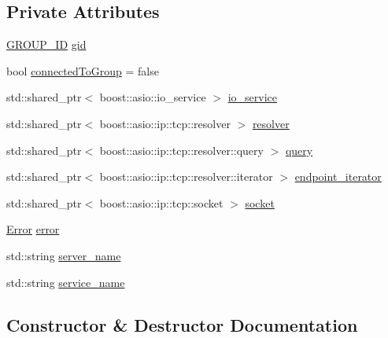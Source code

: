 \subsection*{Private Attributes}
\begin{DoxyCompactItemize}
\item 
\hyperlink{namespaceshaan97_1_1sync_a34cebf175d27dfc3d82f24608f7043c1}{G\+R\+O\+U\+P\+\_\+\+ID} \hyperlink{classshaan97_1_1sync_1_1_client_a2708c76151616ac36af4aedecee5beb1}{gid}
\item 
bool \hyperlink{classshaan97_1_1sync_1_1_client_a8dc007c6e1c0fb4a20112e8cc10b8b7c}{connected\+To\+Group} = false
\item 
std\+::shared\+\_\+ptr$<$ boost\+::asio\+::io\+\_\+service $>$ \hyperlink{classshaan97_1_1sync_1_1_client_a3012a6e9540155af7245d898bfdd7986}{io\+\_\+service}
\item 
std\+::shared\+\_\+ptr$<$ boost\+::asio\+::ip\+::tcp\+::resolver $>$ \hyperlink{classshaan97_1_1sync_1_1_client_a6e2a1fef479966299280a231815ab6c9}{resolver}
\item 
std\+::shared\+\_\+ptr$<$ boost\+::asio\+::ip\+::tcp\+::resolver\+::query $>$ \hyperlink{classshaan97_1_1sync_1_1_client_a6c37abd3f312836146b4e140b0cf7680}{query}
\item 
std\+::shared\+\_\+ptr$<$ boost\+::asio\+::ip\+::tcp\+::resolver\+::iterator $>$ \hyperlink{classshaan97_1_1sync_1_1_client_a0afe11a920512355f1b23dfff1c42b08}{endpoint\+\_\+iterator}
\item 
std\+::shared\+\_\+ptr$<$ boost\+::asio\+::ip\+::tcp\+::socket $>$ \hyperlink{classshaan97_1_1sync_1_1_client_a55bfc26c9a8e09b61c9075198abd52a6}{socket}
\item 
\hyperlink{classshaan97_1_1sync_1_1_error}{Error} \hyperlink{classshaan97_1_1sync_1_1_client_a302a10619aece387dc9938196740f0c8}{error}
\item 
std\+::string \hyperlink{classshaan97_1_1sync_1_1_client_a8edca95d3206d3c71bf851ad2dea7ec7}{server\+\_\+name}
\item 
std\+::string \hyperlink{classshaan97_1_1sync_1_1_client_a80e8c87abf08c599948d6464caa148e7}{service\+\_\+name}
\end{DoxyCompactItemize}


\subsection{Constructor \& Destructor Documentation}
\mbox{\label{classshaan97_1_1sync_1_1_client_aa9620e6828907c167babfc66a2926510}} 

